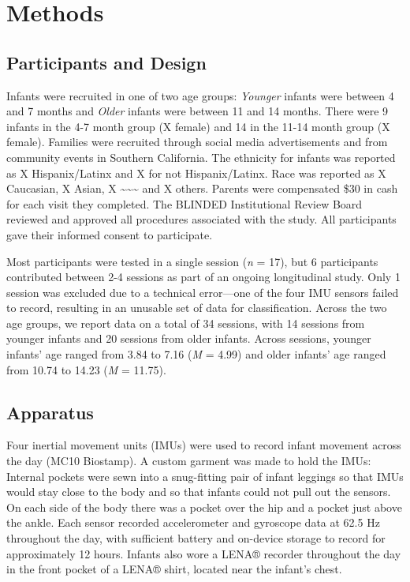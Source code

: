 \documentclass[
  man]{apa6}
\begin{document}
\hypertarget{methods}{%
\section{Methods}\label{methods}}

\hypertarget{participants-and-design}{%
\subsection{Participants and Design}\label{participants-and-design}}

Infants were recruited in one of two age groups: \emph{Younger} infants were between 4 and 7 months and \emph{Older} infants were between 11 and 14 months. There were 9 infants in the 4-7 month group (X female) and 14 in the 11-14 month group (X female). Families were recruited through social media advertisements and from community events in Southern California. The ethnicity for infants was reported as X Hispanix/Latinx and X for not Hispanix/Latinx. Race was reported as X Caucasian, X Asian, X \textasciitilde\textasciitilde\textasciitilde{} and X others. Parents were compensated \$30 in cash for each visit they completed. The BLINDED Institutional Review Board reviewed and approved all procedures associated with the study. All participants gave their informed consent to participate.

Most participants were tested in a single session (\emph{n} = 17), but 6 participants contributed between 2-4 sessions as part of an ongoing longitudinal study. Only 1 session was excluded due to a technical error---one of the four IMU sensors failed to record, resulting in an unusable set of data for classification. Across the two age groups, we report data on a total of 34 sessions, with 14 sessions from younger infants and 20 sessions from older infants. Across sessions, younger infants' age ranged from 3.84 to 7.16 (\emph{M} = 4.99) and older infants' age ranged from 10.74 to 14.23 (\emph{M} = 11.75).

\hypertarget{apparatus}{%
\subsection{Apparatus}\label{apparatus}}

Four inertial movement units (IMUs) were used to record infant movement across the day (MC10 Biostamp). A custom garment was made to hold the IMUs: Internal pockets were sewn into a snug-fitting pair of infant leggings so that IMUs would stay close to the body and so that infants could not pull out the sensors. On each side of the body there was a pocket over the hip and a pocket just above the ankle. Each sensor recorded accelerometer and gyroscope data at 62.5 Hz throughout the day, with sufficient battery and on-device storage to record for approximately 12 hours. Infants also wore a LENA® recorder throughout the day in the front pocket of a LENA® shirt, located near the infant's chest.
\end{document}
